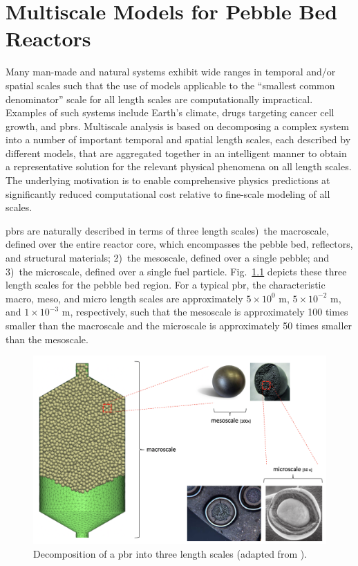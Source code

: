 \chapter{Multiscale Models for Pebble Bed Reactors}
\label{sec:PhysicalModels}

Many man-made and natural systems exhibit wide ranges in temporal and/or spatial scales such that the use of models applicable to the ``smallest common denominator'' scale for all length scales are computationally impractical. Examples of such systems include Earth's climate, drugs targeting cancer cell growth, and \glspl{pbr}. Multiscale analysis is based on decomposing a complex system into a number of important temporal and spatial length scales, each described by different models, that are aggregated together in an intelligent manner to obtain a representative solution for the relevant physical phenomena on all length scales. The underlying motivation is to enable comprehensive physics predictions at significantly reduced computational cost relative to fine-scale modeling of all scales. 

\glspl{pbr} are naturally described in terms of three length scales)~the macroscale, defined over the entire reactor core, which encompasses the pebble bed, reflectors, and structural materials; 2)~the mesoscale, defined over a single pebble; and 3)~the microscale, defined over a single fuel particle. Fig.\ \ref{fig:multiscale} depicts these three length scales for the pebble bed region. For a typical \gls{pbr}, the characteristic macro, meso, and micro length scales are approximately \(5\times10^0\) m, \(5\times10^{-2}\) m, and \(1\times10^{-3}\) m, respectively, such that the mesoscale is approximately 100 times smaller than the macroscale and the microscale is approximately 50 times smaller than the mesoscale. 

\begin{figure}[!h]
\centering
\includegraphics[width=\linewidth]{figs/multiscale_pbr.png}
\caption{Decomposition of a \gls{pbr} into three length scales (adapted from \cite{aufiero_2016,pebble_cut,pebble_uncut,triso_closeup,hales}).}
\label{fig:multiscale}
\end{figure}


